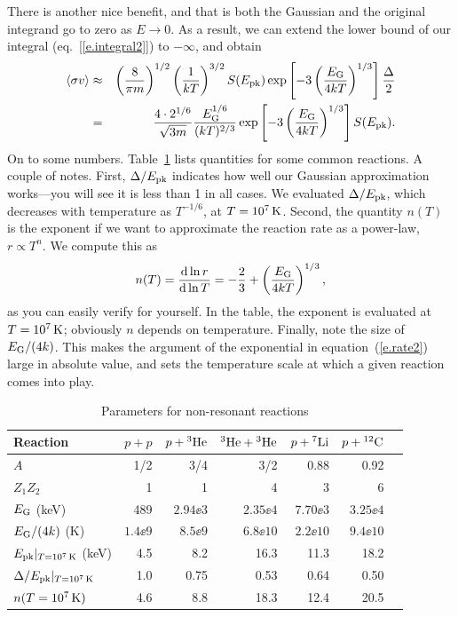 There is another nice benefit, and that is both the Gaussian and the original integrand go to zero as $E\to 0$.  As a result, we can extend the lower bound of our integral (eq.~[\ref{e.integral2}]) to $-\infty$, and obtain
\begin{eqnarray}\label{e.rate2}
\langle\sigma v\rangle &\approx& \left(\frac{8}{\pi m}\right)^{1/2}\left(\frac{1}{kT}\right)^{3/2} S(\Epk) \exp\left[-3\left(\frac{\EG}{4kT}\right)^{1/3}\right]\frac{\Delta}{2}\nonumber\\
 &=& \frac{4\cdot 2^{1/6}}{\sqrt{3m}}\frac{\EG^{1/6}}{(kT)^{2/3}} \exp\left[-3\left(\frac{\EG}{4kT}\right)^{1/3}\right]  S(\Epk).
\end{eqnarray}
On to some numbers. Table~\ref{t.reaction} lists quantities for some common reactions. A couple of notes. First, $\Delta/\Epk$ indicates how well our Gaussian approximation works---you will see it is less than 1 in all cases. We evaluated $\Delta/\Epk$, which decreases with temperature as $T^{-1/6}$, at $T = 10^{7}\nsp\K$. Second, the quantity $n(T)$ is the exponent if we want to approximate the reaction rate as a power-law, $r\propto T^{n}$.  We compute this as 
\begin{equation}\label{e.exponent}
 n(T) = \frac{\dif\ln r}{\dif\ln T} = -\frac{2}{3} + \left(\frac{\EG}{4kT}\right)^{1/3},
 \end{equation}
 as you can easily verify for yourself. In the table, the exponent is evaluated at $T = 10^{7}\nsp\K$; obviously $n$ depends on temperature. Finally, note the size of $\EG/(4k)$.  This makes the argument of the exponential in equation~(\ref{e.rate2}) large in absolute value, and sets the temperature scale at which a given reaction comes into play.
 
\begin{table}[htbp]
\caption{\label{t.reaction} Parameters for non-resonant reactions}
\begin{tabular}{lrrrrrr}
\\ \hline
Reaction & $p+p$ & $p+\helium[3]$ & $\helium[3]+\helium[3]$ & $p+\lithium[7]$ & $p+\carbon$\\
\hline\hline
$A$ & 1/2 & 3/4 & 3/2 & 0.88 & 0.92 \\
$Z_{1}Z_{2}$ & 1 & 1 & 4 & 3 & 6 \\
$\EG$ (keV) & 489 & $2.94\ee{3}$ & $2.35\ee{4}$ & $7.70\ee{3}$ & $3.25\ee{4}$\\
$\EG/(4k)$ (K) & $1.4\ee{9}$ & $8.5\ee{9}$ & $6.8\ee{10}$ & $2.2\ee{10}$ & $9.4\ee{10}$ \\
$\Epk|_{T=10^{7}\nsp\K}$ (keV) & 4.5 & 8.2 & 16.3 & 11.3 & 18.2\\
$\Delta/\Epk|_{T=10^{7}\nsp\K}$ & 1.0 & 0.75 & 0.53 & 0.64 & 0.50 \\
$n(T = 10^{7}\nsp\K)$ & 4.6 & 8.8 & 18.3 & 12.4 & 20.5\\
\hline
\end{tabular}
\end{table}
 